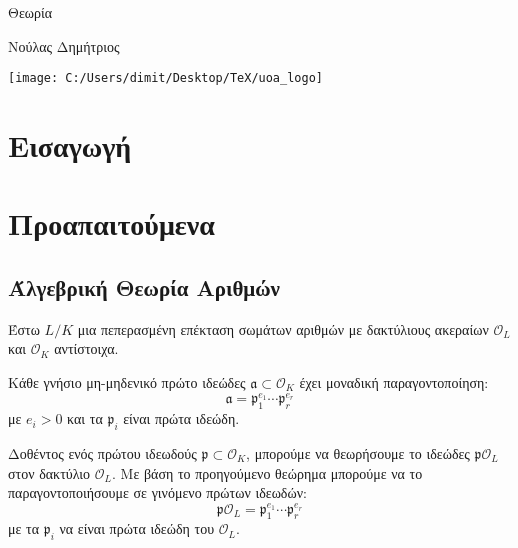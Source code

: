 \documentclass{report}
\begin{document}
	
	
	
	
	\begin{framed}	
		\begin{center}
			\huge Θεωρία 
		\end{center}
		\vspace{0.3truecm}
		\begin{center}
            Νούλας Δημήτριος\\
\end{center}
		\vspace{0.3truecm}
	\end{framed}
	\vspace*{\fill}
	\begin{center}
	\texttt{[image: C:/Users/dimit/Desktop/TeX/uoa\_logo]}
	\end{center}
\vspace{1cm}
\pagebreak

\tableofcontents
\pagebreak

\chapter{Εισαγωγή}

\chapter{Προαπαιτούμενα}

\section{Άλγεβρική Θεωρία Αριθμών}

\noindent Έστω $L/K$ μια πεπερασμένη επέκταση σωμάτων αριθμών με δακτύλιους ακεραίων $\mathcal{O}_L$ και $\mathcal{O}_K$ αντίστοιχα.

\begin{theorem}
	Κάθε γνήσιο μη-μηδενικό πρώτο ιδεώδες $\mathfrak{a} \subset \mathcal{O}_K$ έχει μοναδική παραγοντοποίηση:
	$$\mathfrak{a} = \mathfrak{p}_1^{e_1} \cdots \mathfrak{p}_r^{e_r}$$ με $e_i > 0$ και τα $\mathfrak{p}_i$ είναι πρώτα ιδεώδη.
\end{theorem}

Δοθέντος ενός πρώτου ιδεωδούς $\mathfrak{p} \subset \mathcal{O}_K$, μπορούμε να θεωρήσουμε το ιδεώδες $\mathfrak{p} \mathcal{O}_L$ στον δακτύλιο $\mathcal{O}_L$. Με βάση το προηγούμενο θεώρημα μπορούμε να το παραγοντοποιήσουμε σε γινόμενο πρώτων ιδεωδών:
\begin{equation}
	\label{eq2.1}
	\mathfrak{p}\mathcal{O}_L = \mathfrak{p}_1^{e_1} \cdots \mathfrak{p}_r^{e_r}
\end{equation}  με τα $\mathfrak{p}_i$ να είναι πρώτα ιδεώδη του $\mathcal{O}_L$.
\end{document}
